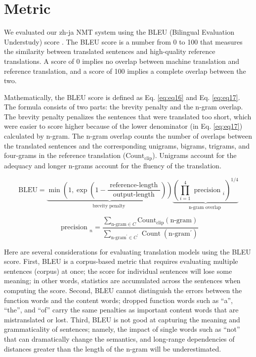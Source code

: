\section{Metric} \label{sec:metric}

We evaluated our zh-ja NMT system using the BLEU (Bilingual Evaluation Understudy) score \cite{papineni2002bleu}. The BLEU score is a number from 0 to 100 that measures the similarity between translated sentences and high-quality reference translations. A score of 0 implies no overlap between machine translation and reference translation, and a score of 100 implies a complete overlap between the two.

Mathematically, the BLEU score is defined as Eq. \ref{eq:eq16} and Eq. \ref{eq:eq17}. The formula consists of two parts: the brevity penalty and the n-gram overlap. The brevity penalty penalizes the sentences that were translated too short, which were easier to score higher because of the lower denominator (in Eq. \ref{eq:eq17}) calculated by n-gram. The n-gram overlap counts the number of overlaps between the translated sentences and the corresponding unigrams, bigrams, trigrams, and four-grams in the reference translation ($\text{Count}_\text{clip}$). Unigrams account for the adequacy and longer n-grams account for the fluency of the translation.

\begin{equation}
    \mathrm{BLEU}=\underbrace{\min \left(1, \exp \left(1-\frac{\text { reference-length }}{\text { output-length }}\right)\right)}_{\text {brevity penalty }} \underbrace{\left(\prod_{i=1}^{4} \text { precision }_{i}\right)^{1 / 4}}_{\text {n-gram overlap }} \label{eq:eq16}
\end{equation}

\begin{equation}
    \text { precision }_{n} = \frac{\sum_{ \text {n-gram} \in C} \text {Count}_{\text {clip}}(\text {n-gram})}{\sum_{\text{n-gram}^{\prime} \in C^{\prime}} \operatorname{Count}\left(\text{n-gram}^{\prime}\right)} \label{eq:eq17}
\end{equation}

Here are several considerations for evaluating translation models using the BLEU score. First, BLEU is a corpus-based metric that requires evaluating multiple sentences (corpus) at once; the score for individual sentences will lose some meaning; in other words, statistics are accumulated across the sentences when computing the score. Second, BLEU cannot distinguish the errors between the function words and the content words; dropped function words such as ``a'', ``the'', and ``of'' carry the same penalties as important content words that are mistranslated or lost. Third, BLEU is not good at capturing the meaning and grammaticality of sentences; namely, the impact of single words such as ``not'' that can dramatically change the semantics, and long-range dependencies of distances greater than the length of the n-gram will be underestimated.

